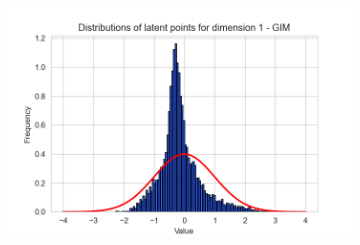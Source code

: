 \begin{figure}[h]
	\centering
	\begin{subfigure}[b]{0.25\textwidth}
		\centering
		\includegraphics[width=1\linewidth]{"graphs/distr/module1 kld0035/_ distribution_latent_space_GIM_dim=0"}
		

\end{subfigure}
\end{figure}
